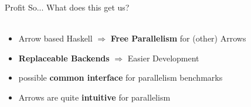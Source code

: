 \begin{frame}[fragile]{Profit}
So... What does this get us?\\~\\
\begin{itemize}
	\item Arrow based Haskell $\Rightarrow$ \textbf{Free Parallelism} for (other) Arrows
	\item \textbf{Replaceable Backends} $\Rightarrow$ Easier Development
	\item possible \textbf{common interface} for parallelism benchmarks
	\item Arrows are quite \textbf{intuitive} for parallelism
\end{itemize}
\vfill	
\end{frame}